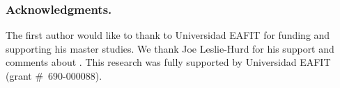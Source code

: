 \documentclass[../main.tex]{subfiles}
\begin{document}

\subsubsection*{Acknowledgments.}

The first author would like to thank to Universidad EAFIT for funding
and supporting his master studies. We thank Joe Leslie-Hurd for his
support and comments about \Metis. This research was fully supported
by Universidad EAFIT (grant \#~690-000088).
\end{document}
